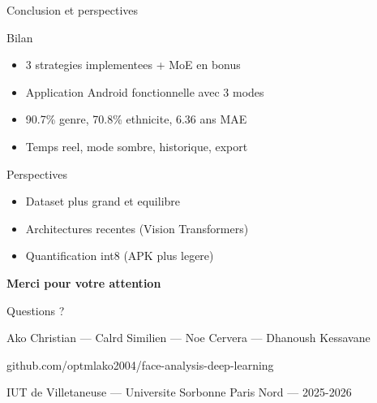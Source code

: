 \documentclass[aspectratio=169, 12pt]{beamer}
\begin{document}
\begin{frame}{Conclusion et perspectives}

\begin{block}{Bilan}
{\small
\begin{itemize}
    \item 3 strategies implementees + MoE en bonus
    \item Application Android fonctionnelle avec 3 modes
    \item 90.7\% genre, 70.8\% ethnicite, 6.36 ans MAE
    \item Temps reel, mode sombre, historique, export
\end{itemize}
}
\end{block}

\vspace{0.2cm}

\begin{exampleblock}{Perspectives}
{\small
\begin{itemize}
    \item Dataset plus grand et equilibre
    \item Architectures recentes (Vision Transformers)
    \item Quantification int8 (APK plus legere)
\end{itemize}
}
\end{exampleblock}
\end{frame}

\begin{frame}[plain]
\vfill
\begin{center}
{\Huge\bfseries\color{navy} Merci pour votre attention}

\vspace{0.8cm}
{\Large\color{steel} Questions ?}

\vspace{0.8cm}
{\normalsize Ako Christian --- Calrd Similien --- Noe Cervera --- Dhanoush Kessavane}

\vspace{0.3cm}
{\small\color{steel} github.com/optmlako2004/face-analysis-deep-learning}

\vspace{0.2cm}
{\small IUT de Villetaneuse --- Universite Sorbonne Paris Nord --- 2025-2026}
\end{center}
\vfill
\end{frame}
\end{document}

